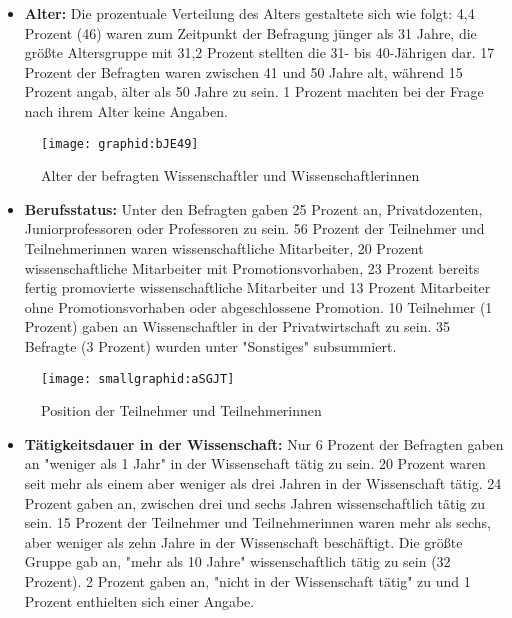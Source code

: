 \begin{itemize}
\item \textbf{Alter:} Die prozentuale Verteilung des Alters gestaltete sich wie folgt: 4,4 Prozent (46) waren zum Zeitpunkt der Befragung jünger als 31 Jahre, die größte Altersgruppe mit 31,2 Prozent stellten die 31- bis 40-Jährigen dar. 17 Prozent der Befragten waren zwischen 41 und 50 Jahre alt, während 15 Prozent angab, älter als 50 Jahre zu sein. 1 Prozent machten bei der Frage nach ihrem Alter keine Angaben.
\end{itemize}

\begin{figure}[h!]
\texttt{[image: graphid:bJE49]}
\caption{Alter der befragten Wissenschaftler und Wissenschaftlerinnen}
\end{figure}

\begin{itemize}
\item \textbf{Berufsstatus:} Unter den Befragten gaben 25 Prozent an, Privatdozenten, Juniorprofessoren oder Professoren zu sein. 56 Prozent der Teilnehmer und Teilnehmerinnen waren wissenschaftliche Mitarbeiter, 20 Prozent wissenschaftliche Mitarbeiter mit Promotionsvorhaben, 23 Prozent bereits fertig promovierte wissenschaftliche Mitarbeiter und 13 Prozent Mitarbeiter ohne Promotionsvorhaben oder abgeschlossene Promotion. 10 Teilnehmer (1 Prozent) gaben an Wissenschaftler in der Privatwirtschaft zu sein. 35 Befragte (3 Prozent) wurden unter "Sonstiges" subsummiert.
\end{itemize}

\begin{figure}[h!]
\texttt{[image: smallgraphid:aSGJT]}
\caption{Position der Teilnehmer und Teilnehmerinnen}
\end{figure}

\begin{itemize}
\item \textbf{Tätigkeitsdauer in der Wissenschaft:} Nur 6 Prozent der Befragten gaben an "weniger als 1 Jahr" in der Wissenschaft tätig zu sein. 20 Prozent waren seit mehr als einem aber weniger als drei Jahren in der Wissenschaft tätig. 24 Prozent gaben an, zwischen drei und sechs Jahren wissenschaftlich tätig zu sein. 15 Prozent der Teilnehmer und Teilnehmerinnen waren mehr als sechs, aber weniger als zehn Jahre in der Wissenschaft beschäftigt. Die größte Gruppe gab an, "mehr als 10 Jahre" wissenschaftlich tätig zu sein (32 Prozent). 2 Prozent gaben an, "nicht in der Wissenschaft tätig" zu und 1 Prozent enthielten sich einer Angabe.
\end{itemize}

